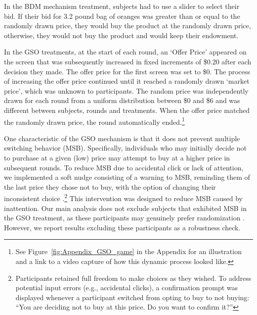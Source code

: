 \documentclass[12pt]{article}
\begin{document}
In the BDM mechanism treatment, subjects had to use a slider to select their bid. If their bid for 3.2 pound bag of oranges was greater than or equal to the randomly drawn price, they would buy the product at the randomly drawn price, otherwise, they would not buy the product and would keep their endowment.

In the GSO treatments, at the start of each round, an `Offer Price' appeared on the screen that was subsequently increased in fixed increments of \$0.20 after each decision they made. The offer price for the first screen was set to \$0. The process of increasing the offer price continued until it reached a randomly drawn `market price', which was unknown to participants. The random price was independently drawn for each round from a uniform distribution between \$0 and \$6 and was different between subjects, rounds and treatments. When the offer price matched the randomly drawn price, the round automatically ended.\footnote{See Figure~\ref{fig:Appendix_GSO_game} in the Appendix for an illustration and a link to a video capture of how this dynamic process looked like.} 



One characteristic of the GSO mechanism is that it does not prevent multiple switching behavior (MSB). Specifically, individuals who may initially decide not to purchase at a given (low) price may attempt to buy at a higher price in subsequent rounds. To reduce MSB due to accidental click or lack of attention, we implemented a soft nudge consisting of a warning to MSB, reminding them of the last price they chose not to buy, with the option of changing their inconsistent choice \citep{yu2021multiple}.\footnote{Participants retained full freedom to make choices as they wished. To address potential input errors (e.g., accidental clicks), a confirmation prompt was displayed whenever a participant switched from opting to buy to not buying: ``You are deciding not to buy at this price. Do you want to confirm it?''} 
This intervention was designed to reduce MSB caused by inattention. Our main analysis does not exclude subjects that exhibited MSB in the GSO treatment, as these participants may genuinely prefer randomization \citep{agranov2017stochastic}. However, we report results excluding these participants as a robustness check.
    
\end{document}
